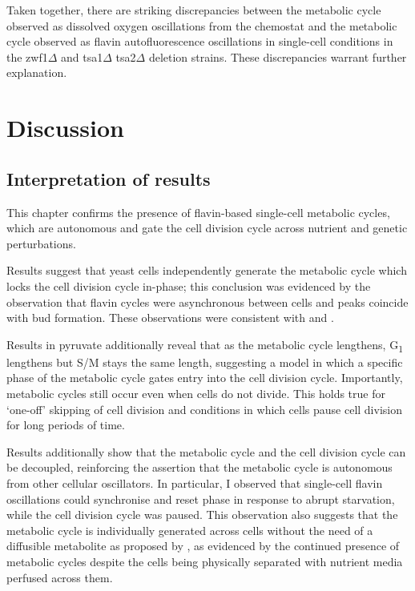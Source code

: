 Taken together, there are striking discrepancies between the metabolic cycle observed as dissolved oxygen oscillations from the chemostat and the metabolic cycle observed as flavin autofluorescence oscillations in single-cell conditions in the zwf1$\Delta$ and tsa1$\Delta$ tsa2$\Delta$ deletion strains.
These discrepancies warrant further explanation.


\section{Discussion}
\label{sec:biology-discussion}

\subsection{Interpretation of results}
\label{subsec:biology-discussion-interpretation}

This chapter confirms the presence of flavin-based single-cell metabolic cycles, which are autonomous and gate the cell division cycle across nutrient and genetic perturbations.

Results suggest that yeast cells independently generate the metabolic cycle which locks the cell division cycle in-phase;
this conclusion was evidenced by the observation that flavin cycles were asynchronous between cells and peaks coincide with bud formation.
These observations were consistent with \textcite{papagiannakisAutonomousMetabolicOscillations2017} and \textcite{baumgartnerFlavinbasedMetabolicCycles2018}.

Results in pyruvate additionally reveal that as the metabolic cycle lengthens, G\textsubscript{1} lengthens but S/M stays the same length, suggesting a model in which a specific phase of the metabolic cycle gates entry into the cell division cycle.
Importantly, metabolic cycles still occur even when cells do not divide.
This holds true for `one-off' skipping of cell division and conditions in which cells pause cell division for long periods of time.

Results additionally show that the metabolic cycle and the cell division cycle can be decoupled, reinforcing the assertion that the metabolic cycle is autonomous from other cellular oscillators.
In particular, I observed that single-cell flavin oscillations could synchronise and reset phase in response to abrupt starvation, while the cell division cycle was paused.
This observation also suggests that the metabolic cycle is individually generated across cells without the need of a diffusible metabolite as proposed by \textcite{krishnaMinimalPushPull2018}, as evidenced by the continued presence of metabolic cycles despite the cells being physically separated with nutrient media perfused across them.

